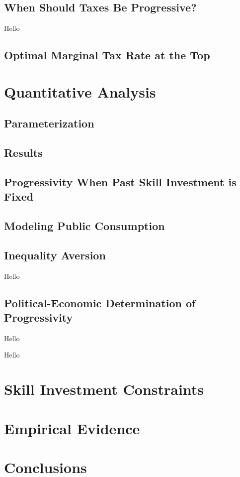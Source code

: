 \documentclass{article}
\begin{document}
\subsection{When Should Taxes Be Progressive?}

{
\proposition Hello

}

\subsection{Optimal Marginal Tax Rate at the Top}

\section{Quantitative Analysis}

\subsection{Parameterization}

\subsection{Results}

\subsection{Progressivity When Past Skill Investment is Fixed}

\subsection{Modeling Public Consumption}

\subsection{Inequality Aversion}

{
\proposition Hello

}

\subsection{Political-Economic Determination of Progressivity}

{
\proposition Hello

}

{
\proposition Hello

}

\section{Skill Investment Constraints}

\section{Empirical Evidence}

\section{Conclusions}
\end{document}
